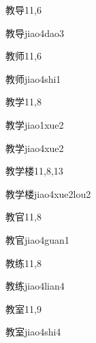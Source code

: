 \begin{entry}{教导}{11,6}
  \begin{phonetics}{教导}{jiao4dao3}
  \end{phonetics}
\end{entry}

\begin{entry}{教师}{11,6}
  \begin{phonetics}{教师}{jiao4shi1}
  \end{phonetics}
\end{entry}

\begin{entry}{教学}{11,8}
  \begin{phonetics}{教学}{jiao1xue2}
  \end{phonetics}
  \begin{phonetics}{教学}{jiao4xue2}
  \end{phonetics}
\end{entry}

\begin{entry}{教学楼}{11,8,13}
  \begin{phonetics}{教学楼}{jiao4xue2lou2}
  \end{phonetics}
\end{entry}

\begin{entry}{教官}{11,8}
  \begin{phonetics}{教官}{jiao4guan1}
  \end{phonetics}
\end{entry}

\begin{entry}{教练}{11,8}
  \begin{phonetics}{教练}{jiao4lian4}
  \end{phonetics}
\end{entry}

\begin{entry}{教室}{11,9}
  \begin{phonetics}{教室}{jiao4shi4}
  \end{phonetics}
\end{entry}

